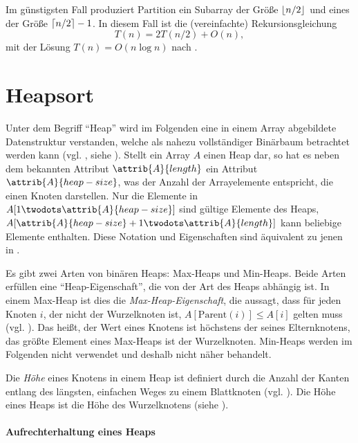 Im günstigsten Fall produziert $\text{Partition}$ ein Subarray der Größe $\left\lfloor n/2 \right\rfloor$ und eines der Größe $\left\lceil n/2 \right\rceil - 1$. In diesem Fall ist die (vereinfachte) Rekursionsgleichung
\begin{equation*}
    T(n) = 2T(n/2) + O(n),
\end{equation*}
mit der Lösung $T(n) = O(n \log n)$ nach \cite[94]{clrs2001}.

\section{Heapsort}
\label{sec:alg-selection}

Unter dem Begriff \enquote{Heap} wird im Folgenden eine in einem Array abgebildete Datenstruktur verstanden, welche als nahezu vollständiger Binärbaum betrachtet werden kann (vgl. \cite[87f]{ahu1974}, siehe ). Stellt ein Array $A$ einen Heap dar, so hat es neben dem bekannten Attribut $\attrib{A}{length}$ ein Attribut $\attrib{A}{heap-size}$, was der Anzahl der Arrayelemente entspricht, die einen Knoten darstellen. Nur die Elemente in $A[1 \twodots \attrib{A}{heap-size}]$ sind gültige Elemente des Heaps, $A[\attrib{A}{heap-size} + 1 \twodots \attrib{A}{length}]$ kann beliebige Elemente enthalten. Diese Notation und Eigenschaften sind äquivalent zu jenen in \cite{clrs2001}.

Es gibt zwei Arten von binären Heaps: Max-Heaps und Min-Heaps. Beide Arten erfüllen eine \enquote{Heap-Eigenschaft}, die von der Art des Heaps abhängig ist. In einem Max-Heap ist dies die \emph{Max-Heap-Eigenschaft}, die aussagt, dass für jeden Knoten $i$, der nicht der Wurzelknoten ist, $A[\text{Parent}(i)] \leq A[i]$ gelten muss (vgl. \cite[92]{hsr1997}). Das heißt, der Wert eines Knotens ist höchstens der seines Elternknotens, das größte Element eines Max-Heaps ist der Wurzelknoten. Min-Heaps werden im Folgenden nicht verwendet und deshalb nicht näher behandelt.

Die \emph{Höhe} eines Knotens in einem Heap ist definiert durch die Anzahl der Kanten entlang des längsten, einfachen Weges zu einem Blattknoten (vgl. \cite[153]{clrs2001}). Die Höhe eines Heaps ist die Höhe des Wurzelknotens (siehe ).



\pagebreak[4]

\paragraph{Aufrechterhaltung eines Heaps}

